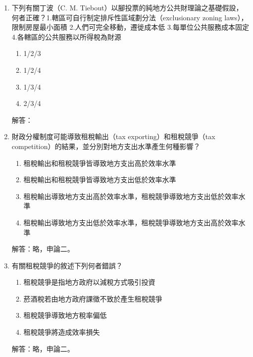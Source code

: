 \documentclass[12pt, a4paper]{article}
\begin{document}
\begin{enumerate}
\begin{itemize}
        當一個新移民搬入某個轄區時，如果他購買的是價值較低的小房子（繳交的財產稅極低），但他卻和當地繳納高額稅金的富人享有完全一樣水準的公共財（如公立學校、圖書館、治安）。原有的居民被迫「補貼」了新移民的公共財成本，導致原有居民的財政負擔相對加重。

        這種因為人口移動而改變轄區內居民「平均稅賦負擔」的現象，就被特稱為「財政外部性」。所以許多富裕社區會實施「排他性區劃 」，禁止建商蓋平價住宅，就是為了防堵負面的財政外部性。
    \end{itemize}

    \item 下列有關丁波（C. M. Tiebout）以腳投票的純地方公共財理論之基礎假設，何者正確？1.轄區可自行制定排斥性區域劃分法（exclusionary zoning laws），限制房屋最小面積 2.人們可完全移動，遷徙成本低 3.每單位公共服務成本固定 4.各轄區的公共服務以所得稅為財源
    \begin{enumerate}[label=\Alph*.]
        \item 1/2/3
        \item 1/2/4
        \item 1/3/4
        \item 2/3/4
    \end{enumerate}
    解答：
    \vspace{2cm}

    \item 財政分權制度可能導致租稅輸出（tax exporting）和租稅競爭（tax competition）的結果，並分別對地方支出水準產生何種影響？
    \begin{enumerate}[label=\Alph*.]
        \item 租稅輸出和租稅競爭皆導致地方支出高於效率水準
        \item 租稅輸出和租稅競爭皆導致地方支出低於效率水準
        \item 租稅輸出導致地方支出高於效率水準，租稅競爭導致地方支出低於效率水準
        \item 租稅輸出導致地方支出低於效率水準，租稅競爭導致地方支出高於效率水準
    \end{enumerate}
    解答：略，申論二。

    \item 有關租稅競爭的敘述下列何者錯誤？
    \begin{enumerate}[label=\Alph*.]
        \item 租稅競爭是指地方政府以減稅方式吸引投資
        \item 菸酒稅若由地方政府課徵不致於產生租稅競爭
        \item 租稅競爭導致地方稅率偏低
        \item 租稅競爭將造成效率損失
    \end{enumerate}
    解答：略，申論二。

\end{enumerate}
\end{document}
